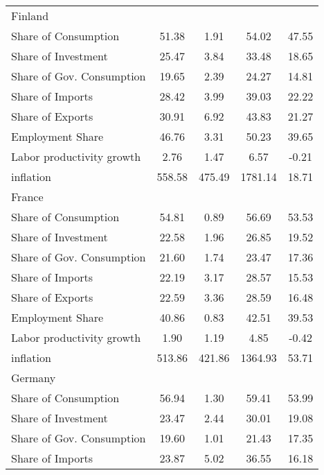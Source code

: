 {\begin{longtable}{l*{1}{cccc}}
Finland             &            &            &            &            \\
Share of Consumption&       51.38&        1.91&       54.02&       47.55\\
Share of Investment &       25.47&        3.84&       33.48&       18.65\\
Share of Gov. Consumption&       19.65&        2.39&       24.27&       14.81\\
Share of Imports    &       28.42&        3.99&       39.03&       22.22\\
Share of Exports    &       30.91&        6.92&       43.83&       21.27\\
Employment Share    &       46.76&        3.31&       50.23&       39.65\\
Labor productivity growth&        2.76&        1.47&        6.57&       -0.21\\
inflation           &      558.58&      475.49&     1781.14&       18.71\\
France              &            &            &            &            \\
Share of Consumption&       54.81&        0.89&       56.69&       53.53\\
Share of Investment &       22.58&        1.96&       26.85&       19.52\\
Share of Gov. Consumption&       21.60&        1.74&       23.47&       17.36\\
Share of Imports    &       22.19&        3.17&       28.57&       15.53\\
Share of Exports    &       22.59&        3.36&       28.59&       16.48\\
Employment Share    &       40.86&        0.83&       42.51&       39.53\\
Labor productivity growth&        1.90&        1.19&        4.85&       -0.42\\
inflation           &      513.86&      421.86&     1364.93&       53.71\\
Germany             &            &            &            &            \\
Share of Consumption&       56.94&        1.30&       59.41&       53.99\\
Share of Investment &       23.47&        2.44&       30.01&       19.08\\
Share of Gov. Consumption&       19.60&        1.01&       21.43&       17.35\\
Share of Imports    &       23.87&        5.02&       36.55&       16.18\\

\end{longtable}}
